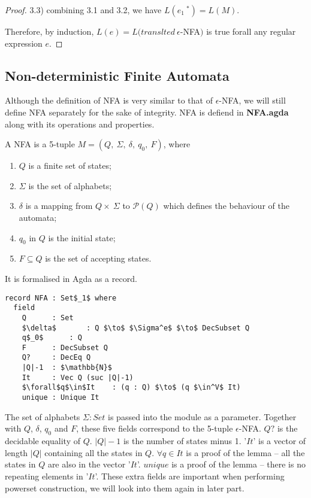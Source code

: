 \begin{proof}
\par 3.3) combining 3.1 and 3.2, we have \(L(e_1\ ^*) = L(M)\). 

\par Therefore, by induction, \(L(e) = L(translted\
\epsilon\)-NFA\()\) is true forall any regular expression \(e\). 
\end{proof}


\subsection{Non-deterministic Finite Automata}
\par Although the definition of NFA is very similar to that of
\(\epsilon\)-NFA, we will still define NFA separately for the sake of
integrity. NFA is defiend in \textbf{NFA.agda} along with its operations and properties. 

\begin{defn}
\noindent A NFA is a 5-tuple \(M = (Q
,\ \Sigma,\ \delta,\ q_0,\ F)\), where
\begin{enumerate}[nolistsep]
  \item \(Q\) is a finite set of states;
  \item \(\Sigma\) is the set of alphabets;
  \item \(\delta\) is a mapping from \(Q \times\ \Sigma\) to
    \(\mathcal P \left({Q}\right)\) which defines the behaviour of the automata;
  \item \(q_0\) in \(Q\) is the initial state;
  \item \(F \subseteq Q\) is the set of accepting states. 
\end{enumerate}
\end{defn}

\par It is formalised in Agda as a record. 

\begin{lstlisting}[mathescape=true,xleftmargin=.3\textwidth]
record NFA : Set$_1$ where
  field
    Q      : Set
    $\delta$       : Q $\to$ $\Sigma^e$ $\to$ DecSubset Q
    q$_0$      : Q
    F      : DecSubset Q
    Q?     : DecEq Q
    |Q|-1  : $\mathbb{N}$
    It     : Vec Q (suc |Q|-1)
    $\forall$q$\in$It    : (q : Q) $\to$ (q $\in^V$ It)
    unique : Unique It
\end{lstlisting}

\par The set of alphabets \(\Sigma : Set\) is passed into the module as a
parameter. Together with \(Q\), \(\delta\),
\(q_0\) and \(F\), these five fields correspond to the 5-tuple
\(\epsilon\)-NFA. \(Q?\) is
the decidable equality of \(Q\). \(|Q|-1\) is the number of states
minus 1. '\(It\)' is a vector of length \(|Q|\) containing all the
states in \(Q\). \(\forall q\in It\) is a
proof of the lemma -- all the states in \(Q\) are also in the vector
'\(It\)'. \(unique\) is a proof of the lemma -- there is no repeating elements in
'\(It\)'. These extra fields are important when performing powerset construction, we will look into them again in later part. 

